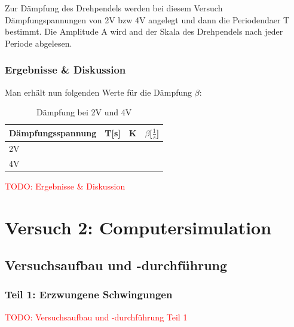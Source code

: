         Zur Dämpfung des Drehpendels werden bei diesem Versuch Dämpfungspannungen von 2V bzw 4V
        angelegt und dann die Periodendaer T bestimmt. Die Amplitude A wird and der Skala des Drehpendels nach jeder Periode abgelesen.

    \subsubsection{Ergebnisse \& Diskussion}
        Man erhält nun folgenden Werte für die Dämpfung $\beta$:

        \begin{table}[H]
            \centering
            \label{tab:Dämpfung bei 2V und 4V}
            \caption{Dämpfung bei 2V und 4V}
            \begin{tabular}{|l|l|l|l|}
                \hline
                Dämpfungsspannung & T[s] & K & $\beta$[$\frac{1}{s}$]\\
                \hline
                2V & & & \\
                \hline
                4V & & & \\
                \hline
            \end{tabular}
        \end{table}  
        \textcolor{red}{TODO: Ergebnisse \& Diskussion}

\newpage

\section{Versuch 2: Computersimulation}

    \subsection{Versuchsaufbau und -durchführung}

        \subsubsection{Teil 1: Erzwungene Schwingungen}
            
            \textcolor{red}{TODO: Versuchsaufbau und -durchführung Teil 1}

